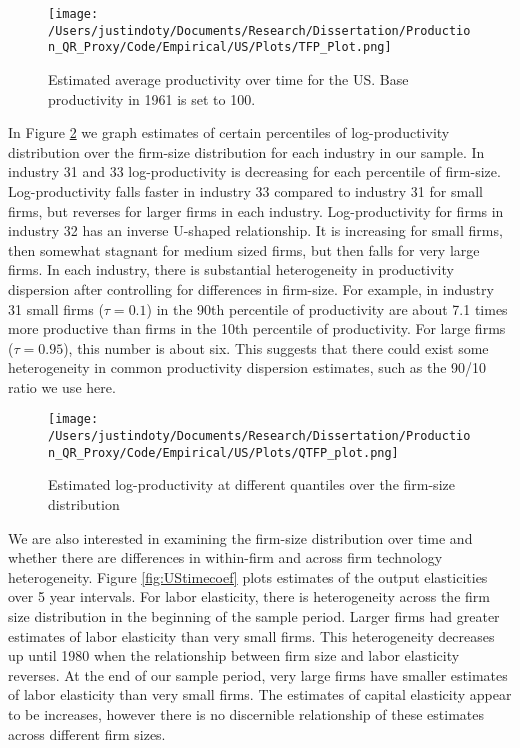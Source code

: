 \documentclass[11pt]{article}
\begin{document}
\begin{figure}[H]
\centering
\texttt{[image: /Users/justindoty/Documents/Research/Dissertation/Production\_QR\_Proxy/Code/Empirical/US/Plots/TFP\_Plot.png]}
\caption{Estimated average productivity over time for the US. Base productivity in 1961 is set to 100.}
\label{fig:USpgrowth}
\end{figure}

In Figure \ref{fig:USpdisp} we graph estimates of certain percentiles of log-productivity distribution over the firm-size distribution for each industry in our sample. In industry 31 and 33 log-productivity is decreasing for each percentile of firm-size. Log-productivity falls faster in industry 33 compared to industry 31 for small firms, but reverses for larger firms in each industry. Log-productivity for firms in industry 32 has an inverse U-shaped relationship. It is increasing for small firms, then somewhat stagnant for medium sized firms, but then falls for very large firms. In each industry, there is substantial heterogeneity in productivity dispersion after controlling for differences in firm-size. For example, in industry 31 small firms ($\tau=0.1$) in the 90th percentile of productivity are about 7.1 times more productive than firms in the 10th percentile of productivity. For large firms ($\tau=0.95$), this number is about six. This suggests that there could exist some heterogeneity in common productivity dispersion estimates, such as the 90/10 ratio we use here.

\begin{figure}[H]
\centering
\texttt{[image: /Users/justindoty/Documents/Research/Dissertation/Production\_QR\_Proxy/Code/Empirical/US/Plots/QTFP\_plot.png]}
\caption{Estimated log-productivity at different quantiles over the firm-size distribution}
\label{fig:USpdisp}
\end{figure}

We are also interested in examining the firm-size distribution over time and whether there are differences in within-firm and across firm technology heterogeneity. Figure \ref{fig:UStimecoef} plots estimates of the output elasticities over 5 year intervals. For labor elasticity, there is heterogeneity across the firm size distribution in the beginning of the sample period. Larger firms had greater estimates of labor elasticity than very small firms. This heterogeneity decreases up until 1980 when the relationship between firm size and labor elasticity reverses. At the end of our sample period, very large firms have smaller estimates of labor elasticity than very small firms. The estimates of capital elasticity appear to be increases, however there is no discernible relationship of these estimates across different firm sizes. 
\end{document}
